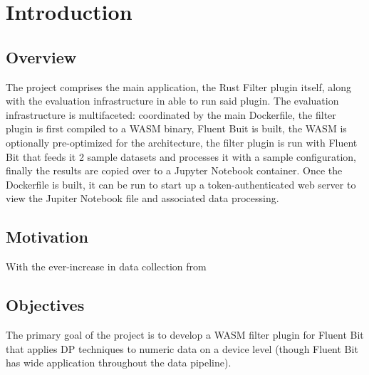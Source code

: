 \chapter{Introduction\label{chap:introduction}}
\section{Overview}




The project comprises the main application, the Rust Filter plugin itself, along with the evaluation infrastructure in able to run said plugin. The evaluation infrastructure is multifaceted: coordinated by the main Dockerfile, the filter plugin is first compiled to a WASM binary, Fluent Buit is built, the WASM is optionally pre-optimized for the architecture, the filter plugin is run with Fluent Bit that feeds it 2 sample datasets and processes it with a sample configuration, finally the results are copied over to a Jupyter Notebook container. Once the Dockerfile is built, it can be run to start up a token-authenticated web server to view the Jupiter Notebook file and associated data processing.

\section{Motivation}
With the ever-increase in data collection from 

\section{Objectives}
The primary goal of the project is to develop a WASM filter plugin for Fluent Bit that applies DP techniques to numeric data on a device level (though Fluent Bit has wide application throughout the data pipeline).

